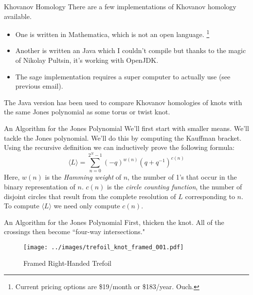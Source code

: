 \documentclass{beamer}
\begin{document}
    \begin{frame}{Khovanov Homology}
        There are a few implementations of Khovanov homology available.
        \begin{itemize}
            \item One is written in Mathematica, which is not an open language.%
                  \footnote{Current pricing options are \$19/month
                            or \$183/year. Ouch.}
            \item Another is written an Java which I couldn't compile but thanks
                  to the magic of Nikolay Pultsin, it's working with OpenJDK.
            \item The sage implementation requires a super computer to actually
                  use (see previous email).
        \end{itemize}
        The Java version has been used to compare Khovanov homologies of
        knots with the same Jones polynomial as some torus or twist knot.
    \end{frame}
    \begin{frame}{An Algorithm for the Jones Polynomial}
        We'll first start with smaller means. We'll tackle the Jones
        polynomial. We'll do this by computing the Kauffman bracket. Using the
        recursive definition we can inductively prove the following formula:
        \begin{equation}
            \label{eqn:kauffman_bracket}%
            \langle{L}\rangle=\sum_{n=0}^{2^{N}-1}
                (-q)^{w(n)}(q+q^{-1})^{c(n)}
        \end{equation}
        Here, $w(n)$ is the \textit{Hamming weight} of $n$, the number of 1's
        that occur in the binary representation of $n$. $c(n)$ is the
        \textit{circle counting function}, the number of disjoint circles that
        result from the complete resolution of $L$ corresponding to $n$.
        To compute $\langle{L}\rangle$ we need only compute $c(n)$.
    \end{frame}
    \begin{frame}{An Algorithm for the Jones Polynomial}
        First, thicken the knot. All of the crossings then become
        ``four-way intersections."
        \begin{figure}
            \centering
            \texttt{[image: ../images/trefoil\_knot\_framed\_001.pdf]}
            \caption{Framed Right-Handed Trefoil}
            \label{fig:trefoil_knot_framed_001}
        \end{figure}
    \end{frame}
\end{document}
